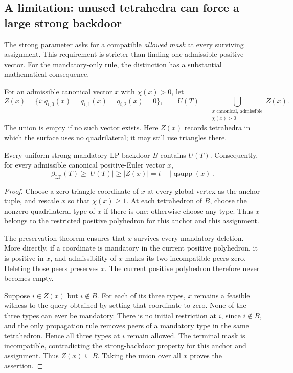 \subsection{A limitation: unused tetrahedra can force a large strong backdoor}
\label{sec:backdoor-obstruction}

The strong parameter asks for a compatible \emph{allowed mask} at every
surviving assignment. This requirement is stricter than finding one
admissible positive vector. For the mandatory-only rule, the distinction
has a substantial mathematical consequence.

For an admissible canonical vector $x$ with $\chi(x)>0$, let
\[
 Z(x)=\{i:q_{i,0}(x)=q_{i,1}(x)=q_{i,2}(x)=0\},
 \qquad
 U(T)=\bigcup_{\substack{x\text{ canonical, admissible}\\\chi(x)>0}}Z(x).
\]
The union is empty if no such vector exists. Here $Z(x)$ records
tetrahedra in which the surface uses no quadrilateral; it may still use
triangles there.

\begin{proposition}
\label{prop:unused-obstruction}
Every uniform strong mandatory-LP backdoor $B$ contains $U(T)$.
Consequently, for every admissible canonical positive-Euler vector $x$,
\begin{equation}\label{eq:unused-lower-bound}
 \beta_{\mathrm{LP}}(T)\ge |U(T)|\ge |Z(x)|
   =t-|\operatorname{qsupp}(x)|.
\end{equation}
\end{proposition}
\begin{proof}
Choose a zero triangle coordinate of $x$ at every global vertex as the
anchor tuple, and rescale $x$ so that $\chi(x)\ge1$. At each tetrahedron
of $B$, choose the nonzero quadrilateral type of $x$ if there is one;
otherwise choose any type. Thus $x$ belongs to the restricted positive
polyhedron for this anchor and this assignment.

The preservation theorem ensures that $x$ survives every mandatory
deletion. More directly, if a coordinate is mandatory in the current
positive polyhedron, it is positive in $x$, and admissibility of $x$
makes its two incompatible peers zero. Deleting those peers preserves
$x$. The current positive polyhedron therefore never becomes empty.

Suppose $i\in Z(x)$ but $i\notin B$. For each of its three types, $x$
remains a feasible witness to the query obtained by setting that
coordinate to zero. None of the three types can ever be mandatory.
There is no initial restriction at $i$, since $i\notin B$, and the only
propagation rule removes peers of a mandatory type in the same
tetrahedron. Hence all three types at $i$ remain allowed. The terminal
mask is incompatible, contradicting the strong-backdoor property for
this anchor and assignment. Thus $Z(x)\subseteq B$. Taking the union over
all $x$ proves the assertion.
\end{proof}


